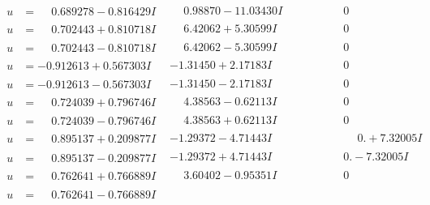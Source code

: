 \documentclass[1p]{elsarticle_modified}
\theoremstyle{definition}
\begin{document}
$$\begin{array}{c|c|c}
\begin{aligned}
u &= \phantom{-}0.689278 - 0.816429 I\end{aligned}
 & \phantom{-}0.98870 - 11.03430 I & \phantom{-0.000000 } 0 \\ \hline\begin{aligned}
u &= \phantom{-}0.702443 + 0.810718 I\end{aligned}
 & \phantom{-}6.42062 + 5.30599 I & \phantom{-0.000000 } 0 \\ \hline\begin{aligned}
u &= \phantom{-}0.702443 - 0.810718 I\end{aligned}
 & \phantom{-}6.42062 - 5.30599 I & \phantom{-0.000000 } 0 \\ \hline\begin{aligned}
u &= -0.912613 + 0.567303 I\end{aligned}
 & -1.31450 + 2.17183 I & \phantom{-0.000000 } 0 \\ \hline\begin{aligned}
u &= -0.912613 - 0.567303 I\end{aligned}
 & -1.31450 - 2.17183 I & \phantom{-0.000000 } 0 \\ \hline\begin{aligned}
u &= \phantom{-}0.724039 + 0.796746 I\end{aligned}
 & \phantom{-}4.38563 - 0.62113 I & \phantom{-0.000000 } 0 \\ \hline\begin{aligned}
u &= \phantom{-}0.724039 - 0.796746 I\end{aligned}
 & \phantom{-}4.38563 + 0.62113 I & \phantom{-0.000000 } 0 \\ \hline\begin{aligned}
u &= \phantom{-}0.895137 + 0.209877 I\end{aligned}
 & -1.29372 - 4.71443 I & \phantom{-0.000000 -}0. + 7.32005 I \\ \hline\begin{aligned}
u &= \phantom{-}0.895137 - 0.209877 I\end{aligned}
 & -1.29372 + 4.71443 I & \phantom{-0.000000 } 0. - 7.32005 I \\ \hline\begin{aligned}
u &= \phantom{-}0.762641 + 0.766889 I\end{aligned}
 & \phantom{-}3.60402 - 0.95351 I & \phantom{-0.000000 } 0 \\ \hline\begin{aligned}
u &= \phantom{-}0.762641 - 0.766889 I\end{aligned}

\end{array}$$
\end{document}
